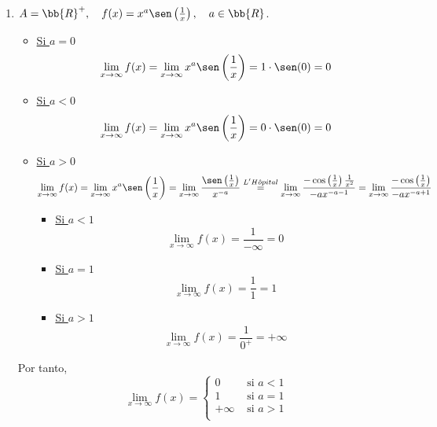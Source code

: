 \begin{ejercicio}
\begin{enumerate}
        \item $A = \bb{R}^+,\quad f(x)=x^a\sen\left(\frac{1}{x}\right),\quad a\in \bb{R}$.
        \begin{itemize}
            \item \underline{Si $a=0$}
            \begin{equation*}
                \lim_{x\to \infty} f(x)
                = \lim_{x\to \infty} x^a\sen\left(\frac{1}{x}\right) = 1\cdot \sen(0) = 0
            \end{equation*}
            \item \underline{Si $a<0$}
            \begin{equation*}
                \lim_{x\to \infty} f(x)
                = \lim_{x\to \infty} x^a\sen\left(\frac{1}{x}\right) = 0\cdot \sen(0) = 0
            \end{equation*}
            \item \underline{Si $a>0$}
            \begin{equation*}
                \lim_{x\to \infty} f(x)
                = \lim_{x\to \infty} x^a\sen\left(\frac{1}{x}\right)
                = \lim_{x\to \infty} \frac{\sen\left(\frac{1}{x}\right)}{x^{-a}}
                \stackrel{L'H\hat{o}pital}{=}
                \lim_{x\to \infty} \frac{-\cos\left(\frac{1}{x}\right)\frac{1}{x^2}}{-ax^{-a-1}}
                = \lim_{x\to \infty} \frac{-\cos\left(\frac{1}{x}\right)}{-ax^{-a+1}}
            \end{equation*}
            \begin{itemize}
                \item \underline{Si $a<1$}
                $$\lim_{x\to \infty} f(x)
                = \frac{1}{-\infty} = 0$$
                \item \underline{Si $a=1$}
                $$\lim_{x\to \infty} f(x)
                = \frac{1}{1} = 1$$
                \item \underline{Si $a>1$}
                $$\lim_{x\to \infty} f(x)
                = \frac{1}{0^+} = +\infty
                $$
            \end{itemize}
        \end{itemize}

        Por tanto,
        \begin{equation*}
            \lim_{x\to \infty} f(x) =
            \left\{ \begin{array}{cc}
                0 & \text{ si } a<1 \\
                1 & \text{ si } a=1 \\
                +\infty & \text{ si } a>1 \\
            \end{array}\right.
        \end{equation*}
        

\end{enumerate}
\end{ejercicio}
